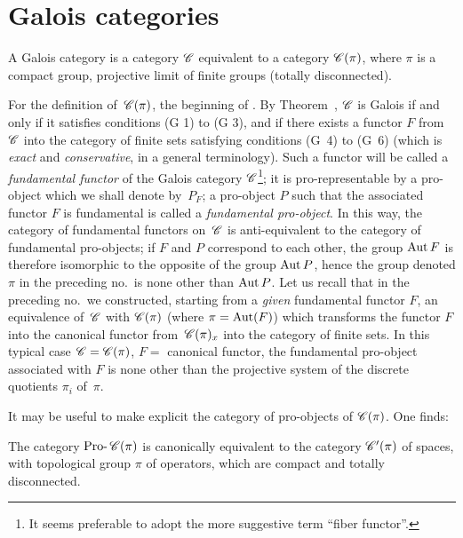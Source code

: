 \section{Galois categories}
\label{V.5}

\begin{definition}
\label{V.5.1}
A Galois category is
a category $\cal{C}$ equivalent to a category
$\cal{C}(\pi)$, where $\pi$ is a compact group, projective limit
of finite groups (\ie totally disconnected).

For the definition of~$\cal{C}(\pi)$, \cf the beginning of \No {}. By
Theorem~, $\cal{C}$ is Galois if and only if
it satisfies conditions (G 1) to (G 3), and if there exists a
functor $F$ from
$\cal{C}$
into the category of finite sets satisfying conditions
(G~4) to (G~6) (\ie which is \emph{exact} and \emph{conservative},
in a general terminology). Such a functor will be
called a \emph{fundamental functor}
of the Galois category $\cal{C}$\kern1pt\footnote{It seems preferable to adopt the more suggestive term
``fiber functor''.};
it is pro-representable by a pro-object which we shall denote by~$P_F$;
a pro-object $P$ such that the associated functor $F$ is fundamental
is called a \emph{fundamental pro-object}.
In this way, the category of fundamental functors on~$\cal{C}$ is anti-equivalent to the category of
fundamental pro-objects; if $F$ and $P$ correspond to each other, the group
$\operatorname{Aut} F$ is therefore isomorphic to the opposite of the group $\operatorname{Aut} P$,
hence the group denoted $\pi$ in the preceding no.\ is
none other than $\operatorname{Aut} P$. Let us recall that in the preceding no.\ we
constructed, starting from a \emph{given} fundamental functor
$F$, an equivalence of~$\cal{C}$ with
$\cal{C}(\pi)$ (where $\pi=\operatorname{Aut}(F)$) which transforms the functor $F$
into the canonical functor from~$\cal{C}(\pi)_x$ into the category of
finite sets. In this typical case $\cal{C}=\cal{C}(\pi)$, $F=$
canonical functor, the fundamental pro-object associated with $F$
is none other than the projective system of the discrete quotients
$\pi_i$ of~$\pi$.
\end{definition}

It may be useful to make explicit the category of pro-objects of
$\cal{C}(\pi)$. One finds:

\begin{proposition}
\label{V.5.2}
The category $\Prodash\cal{C}(\pi)$
is canonically equivalent to the category
$\cal{C}'(\pi)$ of spaces, with topological group $\pi$
of operators, which are compact and totally disconnected.
\end{proposition}

